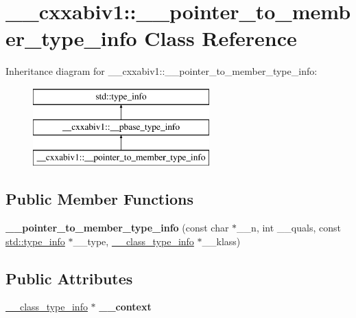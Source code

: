 \hypertarget{class____cxxabiv1_1_1____pointer__to__member__type__info}{\section{\+\_\+\+\_\+cxxabiv1\+:\+:\+\_\+\+\_\+pointer\+\_\+to\+\_\+member\+\_\+type\+\_\+info Class Reference}
\label{class____cxxabiv1_1_1____pointer__to__member__type__info}
}
Inheritance diagram for \+\_\+\+\_\+cxxabiv1\+:\+:\+\_\+\+\_\+pointer\+\_\+to\+\_\+member\+\_\+type\+\_\+info\+:\begin{figure}[H]
\begin{center}
\leavevmode
\includegraphics[height=3.000000cm]{class____cxxabiv1_1_1____pointer__to__member__type__info}
\end{center}
\end{figure}
\subsection*{Public Member Functions}
\begin{DoxyCompactItemize}
\item 
\hypertarget{class____cxxabiv1_1_1____pointer__to__member__type__info_a143147e93c4b19f144c36c299d1a6e3e}{{\bfseries \+\_\+\+\_\+pointer\+\_\+to\+\_\+member\+\_\+type\+\_\+info} (const char $\ast$\+\_\+\+\_\+n, int \+\_\+\+\_\+quals, const \hyperlink{classstd_1_1type__info}{std\+::type\+\_\+info} $\ast$\+\_\+\+\_\+type, \hyperlink{class____cxxabiv1_1_1____class__type__info}{\+\_\+\+\_\+class\+\_\+type\+\_\+info} $\ast$\+\_\+\+\_\+klass)}\label{class____cxxabiv1_1_1____pointer__to__member__type__info_a143147e93c4b19f144c36c299d1a6e3e}

\end{DoxyCompactItemize}
\subsection*{Public Attributes}
\begin{DoxyCompactItemize}
\item 
\hypertarget{class____cxxabiv1_1_1____pointer__to__member__type__info_a231863a4b77fb19014f36b5d98d58b50}{\hyperlink{class____cxxabiv1_1_1____class__type__info}{\+\_\+\+\_\+class\+\_\+type\+\_\+info} $\ast$ {\bfseries \+\_\+\+\_\+context}}\label{class____cxxabiv1_1_1____pointer__to__member__type__info_a231863a4b77fb19014f36b5d98d58b50}

\end{DoxyCompactItemize}
